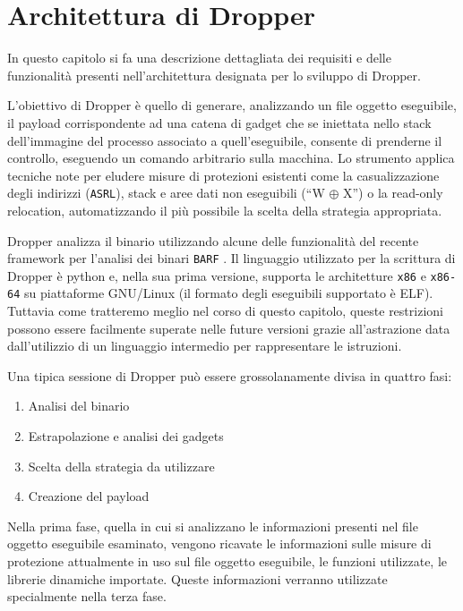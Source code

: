 \chapter{Architettura di Dropper}
\label{cap:architettura}

In questo capitolo si fa una descrizione dettagliata dei requisiti e
delle funzionalità presenti nell'architettura designata per lo
sviluppo di Dropper.

L'obiettivo di Dropper è quello di generare, analizzando un file
oggetto eseguibile, il payload corrispondente ad una catena di gadget
che se iniettata nello stack dell'immagine del processo associato a
quell'eseguibile, consente di prenderne il controllo, eseguendo un
comando arbitrario sulla macchina. Lo strumento applica tecniche note
per eludere misure di protezioni esistenti come la casualizzazione
degli indirizzi (\lstinline{ASRL}), stack e aree dati non eseguibili
(``W $\oplus$ X'') o la read-only relocation, automatizzando il più
possibile la scelta della strategia appropriata. 

Dropper analizza il binario utilizzando alcune delle funzionalità del
recente framework per l'analisi dei binari \lstinline{BARF}
\cite{Heitman-14}. Il linguaggio utilizzato per la scrittura di
Dropper è python e, nella sua prima versione, supporta le architetture
\lstinline{x86} e \lstinline{x86-64} su piattaforme GNU/Linux (il
formato degli eseguibili supportato è ELF). Tuttavia come tratteremo
meglio nel corso di questo capitolo, queste restrizioni possono essere
facilmente superate nelle future versioni grazie all'astrazione data
dall'utilizzio di un linguaggio intermedio per rappresentare le
istruzioni.

Una tipica sessione di Dropper può essere grossolanamente divisa in
quattro fasi:

\begin{enumerate}
\item Analisi del binario 
\item Estrapolazione e analisi dei gadgets
\item Scelta della strategia da utilizzare
\item Creazione del payload
\end{enumerate}

Nella prima fase, quella in cui si analizzano le informazioni presenti
nel file oggetto eseguibile esaminato, vengono ricavate le
informazioni sulle misure di protezione attualmente in uso sul file
oggetto eseguibile, le funzioni utilizzate, le librerie dinamiche
importate. Queste informazioni verranno utilizzate specialmente nella
terza fase.

